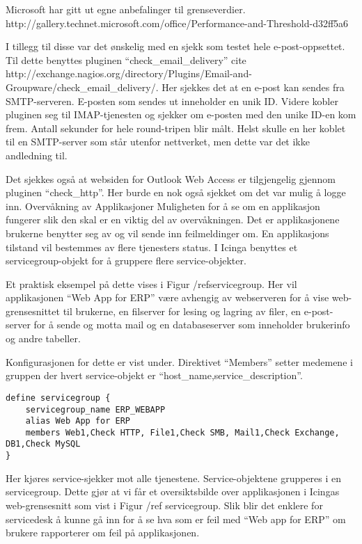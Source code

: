 Microsoft har gitt ut egne anbefalinger til grenseverdier. http://gallery.technet.microsoft.com/office/Performance-and-Threshold-d32ff5a6

I tillegg til disse var det ønskelig med en sjekk som testet hele e-post-oppsettet. Til dette benyttes pluginen “check\_email\_delivery” cite http://exchange.nagios.org/directory/Plugins/Email-and-Groupware/check\_email\_delivery/. Her sjekkes det at en e-post kan sendes fra SMTP-serveren. E-posten som sendes ut inneholder en unik ID. Videre kobler pluginen seg til IMAP-tjenesten og sjekker om e-posten med den unike ID-en kom frem. Antall sekunder for hele round-tripen blir målt. Helst skulle en her koblet til en SMTP-server som står utenfor nettverket, men dette var det ikke andledning til.

Det sjekkes også at websiden for Outlook Web Access er tilgjengelig gjennom pluginen “check\_http”. Her burde en nok også sjekket om det var mulig å logge inn.
Overvåkning av Applikasjoner
Muligheten for å se om en applikasjon fungerer slik den skal er en viktig del av overvåkningen. Det er applikasjonene brukerne benytter seg av og vil sende inn feilmeldinger om. En applikasjons tilstand vil bestemmes av flere tjenesters status. I Icinga benyttes et servicegroup-objekt for å gruppere flere service-objekter.

Et praktisk eksempel på dette vises i Figur /ref{servicegroup}. Her vil applikasjonen “Web App for ERP” være avhengig av webserveren for å vise web-grensesnittet til brukerne, en filserver for lesing og lagring av filer, en e-post-server for å sende og motta mail og en databaseserver som inneholder brukerinfo og andre tabeller. 

Konfigurasjonen for dette er vist under. Direktivet “Members” setter medemene i gruppen der hvert service-objekt er “host\_name,service\_description”.

\begin{lstlisting}
define servicegroup {
	servicegroup_name ERP_WEBAPP
	alias Web App for ERP
	members Web1,Check HTTP, File1,Check SMB, Mail1,Check Exchange, DB1,Check MySQL
}
\end{lstlisting}


Her kjøres service-sjekker mot alle tjenestene. Service-objektene grupperes i en servicegroup. 
Dette gjør at vi får et oversiktsbilde over applikasjonen i Icingas web-grensesnitt som vist i Figur /ref servicegroup. Slik blir det enklere for servicedesk å kunne gå inn for å se hva som er feil med “Web app for ERP” om brukere rapporterer om feil på applikasjonen.

